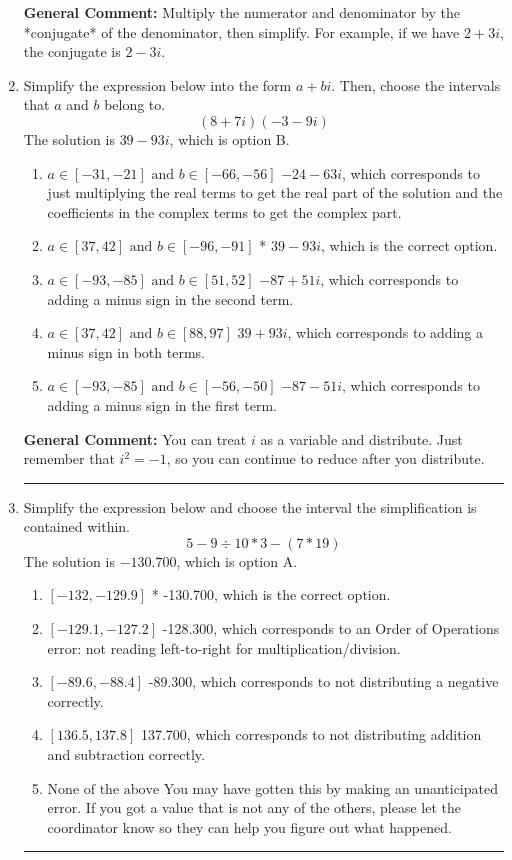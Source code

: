 \documentclass{extbook}[14pt]
\newcommand{\litem}[1]{\item #1

\rule{\textwidth}{0.4pt}}
\begin{document}
\begin{enumerate}
{\textbf{General Comment:} Multiply the numerator and denominator by the *conjugate* of the denominator, then simplify. For example, if we have $2+3i$, the conjugate is $2-3i$.
}
\litem{
Simplify the expression below into the form $a+bi$. Then, choose the intervals that $a$ and $b$ belong to.
\[ (8 + 7 i)(-3 - 9 i) \]
The solution is \( 39 - 93 i \), which is option B.\begin{enumerate}[label=\Alph*.]
\item \( a \in [-31, -21] \text{ and } b \in [-66, -56] \)
 $-24 - 63 i$, which corresponds to just multiplying the real terms to get the real part of the solution and the coefficients in the complex terms to get the complex part.
\item \( a \in [37, 42] \text{ and } b \in [-96, -91] \)
* $39 - 93 i$, which is the correct option.
\item \( a \in [-93, -85] \text{ and } b \in [51, 52] \)
 $-87 + 51 i$, which corresponds to adding a minus sign in the second term.
\item \( a \in [37, 42] \text{ and } b \in [88, 97] \)
 $39 + 93 i$, which corresponds to adding a minus sign in both terms.
\item \( a \in [-93, -85] \text{ and } b \in [-56, -50] \)
 $-87 - 51 i$, which corresponds to adding a minus sign in the first term.
\end{enumerate}

\textbf{General Comment:} You can treat $i$ as a variable and distribute. Just remember that $i^2=-1$, so you can continue to reduce after you distribute.
}
\litem{
Simplify the expression below and choose the interval the simplification is contained within.
\[ 5 - 9 \div 10 * 3 - (7 * 19) \]
The solution is \( -130.700 \), which is option A.\begin{enumerate}[label=\Alph*.]
\item \( [-132, -129.9] \)
* -130.700, which is the correct option.
\item \( [-129.1, -127.2] \)
 -128.300, which corresponds to an Order of Operations error: not reading left-to-right for multiplication/division.
\item \( [-89.6, -88.4] \)
 -89.300, which corresponds to not distributing a negative correctly.
\item \( [136.5, 137.8] \)
 137.700, which corresponds to not distributing addition and subtraction correctly.
\item \( \text{None of the above} \)
 You may have gotten this by making an unanticipated error. If you got a value that is not any of the others, please let the coordinator know so they can help you figure out what happened.
\end{enumerate}

}
\end{enumerate}
\end{document}
